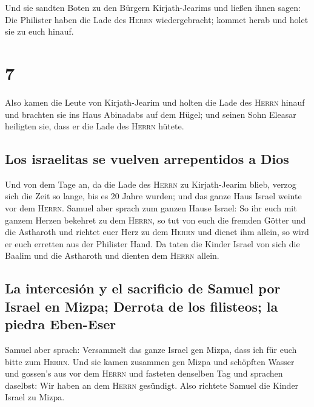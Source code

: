  Und sie sandten Boten zu den Bürgern Kirjath-Jearims und
ließen ihnen sagen: Die Philister haben die Lade des \textsc{Herrn}
wiedergebracht; kommet herab und holet sie zu euch hinauf.

\hypertarget{section-6}{%
\section{7}\label{section-6}}

 Also kamen die Leute von Kirjath-Jearim und holten die
Lade des \textsc{Herrn} hinauf und brachten sie ins Haus Abinadabs auf
dem Hügel; und seinen Sohn Eleasar heiligten sie, dass er die Lade des
\textsc{Herrn} hütete.

\hypertarget{los-israelitas-se-vuelven-arrepentidos-a-dios}{%
\subsection{Los israelitas se vuelven arrepentidos a
Dios}\label{los-israelitas-se-vuelven-arrepentidos-a-dios}}

 Und von dem Tage an, da die Lade des \textsc{Herrn} zu
Kirjath-Jearim blieb, verzog sich die Zeit so lange, bis es 20 Jahre
wurden; und das ganze Haus Israel weinte vor dem \textsc{Herrn}.
 Samuel aber sprach zum ganzen Hause Israel: So ihr euch
mit ganzem Herzen bekehret zu dem \textsc{Herrn}, so tut von euch die
fremden Götter und die Astharoth und richtet euer Herz zu dem
\textsc{Herrn} und dienet ihm allein, so wird er euch erretten aus der
Philister Hand.  Da taten die Kinder Israel von sich die
Baalim und die Astharoth und dienten dem \textsc{Herrn} allein.

\hypertarget{la-intercesiuxf3n-y-el-sacrificio-de-samuel-por-israel-en-mizpa-derrota-de-los-filisteos-la-piedra-eben-eser}{%
\subsection{La intercesión y el sacrificio de Samuel por Israel en
Mizpa; Derrota de los filisteos; la piedra
Eben-Eser}\label{la-intercesiuxf3n-y-el-sacrificio-de-samuel-por-israel-en-mizpa-derrota-de-los-filisteos-la-piedra-eben-eser}}

 Samuel aber sprach: Versammelt das ganze Israel gen
Mizpa, dass ich für euch bitte zum \textsc{Herrn}.  Und
sie kamen zusammen gen Mizpa und schöpften Wasser und gossen's aus vor
dem \textsc{Herrn} und fasteten denselben Tag und sprachen daselbst: Wir
haben an dem \textsc{Herrn} gesündigt. Also richtete Samuel die Kinder
Israel zu Mizpa.

